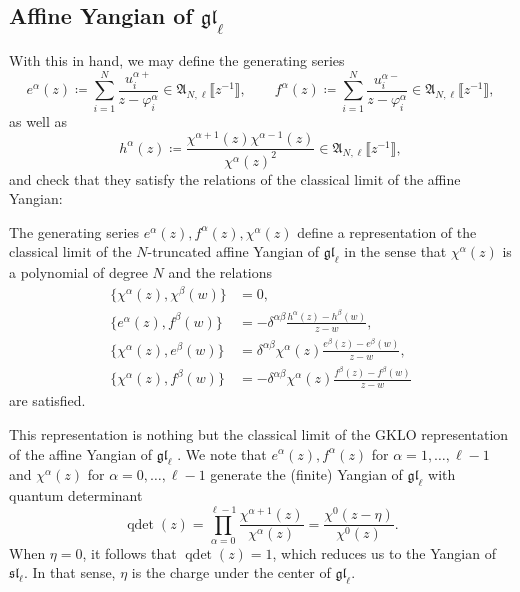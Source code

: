 \subsection{Affine Yangian of $\mathfrak{gl}_\ell$}

With this in hand, we may define the generating series
\begin{equation}
    e^\alpha(z) \coloneq \sum_{i=1}^N \frac{u_i^{\alpha+}}{z-\varphi_i^\alpha} \in \mathfrak{A}_{N,\ell}\llbracket z^{-1} \rrbracket, \qquad f^\alpha(z) \coloneq \sum_{i=1}^N \frac{u_i^{\alpha-}}{z-\varphi_i^\alpha} \in \mathfrak{A}_{N,\ell}\llbracket z^{-1} \rrbracket,
\end{equation}
as well as
\begin{equation}
    h^\alpha(z) \coloneq \frac{\chi^{\alpha+1}(z) \chi^{\alpha-1}(z)}{\chi^\alpha(z)^2} \in \mathfrak{A}_{N,\ell}\llbracket z^{-1} \rrbracket,
\end{equation}
and check that they satisfy the relations of the classical limit of the affine Yangian:

\begin{prop}
    The generating series $e^\alpha(z),f^\alpha(z),\chi^\alpha(z)$ define a representation of the classical limit of the $N$-truncated affine Yangian of $\mathfrak{gl}_\ell$ in the sense that $\chi^\alpha(z)$ is a polynomial of degree $N$ and the relations
    \begin{align}
        \{ \chi^\alpha(z), \chi^\beta(w) \} &=0, \\
        \{ e^\alpha(z),f^\beta(w) \}
        &= -\delta^{\alpha\beta} \frac{h^\alpha(z)-h^\beta(w)}{z-w}, \\
        \{ \chi^\alpha(z),e^\beta(w) \}
        &= \delta^{\alpha\beta} \chi^\alpha(z) \frac{e^\beta(z)-e^\beta(w)}{z-w}, \\
        \{ \chi^\alpha(z),f^\beta(w) \}
        &= -\delta^{\alpha\beta} \chi^\alpha(z) \frac{f^\beta(z)-f^\beta(w)}{z-w}
    \end{align}
    are satisfied.
\end{prop}

\begin{remark}
    This representation is nothing but the classical limit of the GKLO representation of the affine Yangian of $\mathfrak{gl}_\ell$ \cite{gerasimov_class_2005-1}. We note that $e^\alpha(z),f^\alpha(z)$ for $\alpha = 1,\dots,\ell-1$ and $\chi^\alpha(z)$ for $\alpha = 0,\dots,\ell-1$ generate the (finite) Yangian of $\mathfrak{gl}_\ell$ with quantum determinant
    \begin{equation}
        \operatorname{qdet}(z) = \prod_{\alpha=0}^{\ell-1} \frac{\chi^{\alpha+1}(z)}{\chi^\alpha(z)} = \frac{\chi^0(z-\eta)}{\chi^0(z)}.
    \end{equation}
    When $\eta = 0$, it follows that $\operatorname{qdet}(z) = 1$, which reduces us to the Yangian of $\mathfrak{sl}_\ell$. In that sense, $\eta$ is the charge under the center of $\mathfrak{gl}_\ell$.
\end{remark}

